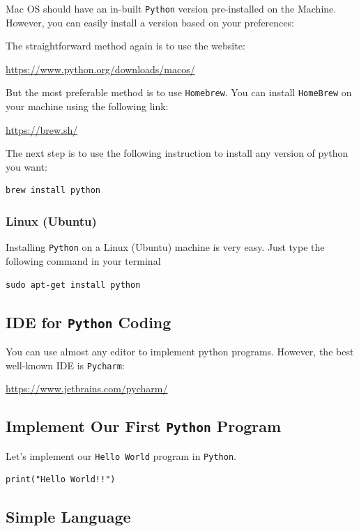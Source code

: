 \documentclass[11pt]{article}
\begin{document}
Mac OS should have an in-built \texttt{Python} version pre-installed on the Machine.
However, you can easily install a version based on your preferences:

The straightforward method again is to use the website:

\url{https://www.python.org/downloads/macos/}

But the most preferable method is to use \texttt{Homebrew}. You can install \texttt{HomeBrew}
on your machine using the following link:

\url{https://brew.sh/}

The next step is to use the following instruction to install any version of
python you want:

\begin{verbatim}
brew install python
\end{verbatim}


\subsubsection{Linux (Ubuntu)}
\label{sec:orgad4c9a1}

Installing \texttt{Python} on a Linux (Ubuntu) machine is very easy. Just type the
following command in your terminal

\begin{verbatim}
sudo apt-get install python
\end{verbatim}


\subsection{IDE for \texttt{Python} Coding}
\label{sec:orgcf35967}

You can use almost any editor to implement python programs. However, the best
well-known IDE is \texttt{Pycharm}:

\url{https://www.jetbrains.com/pycharm/}


\subsection{Implement Our First \texttt{Python} Program}
\label{sec:orga7b2e5c}

Let's implement our \texttt{Hello World} program in \texttt{Python}.

\begin{verbatim}
print("Hello World!!")
\end{verbatim}


\subsection{Simple Language}
\label{sec:org814992f}
\end{document}
